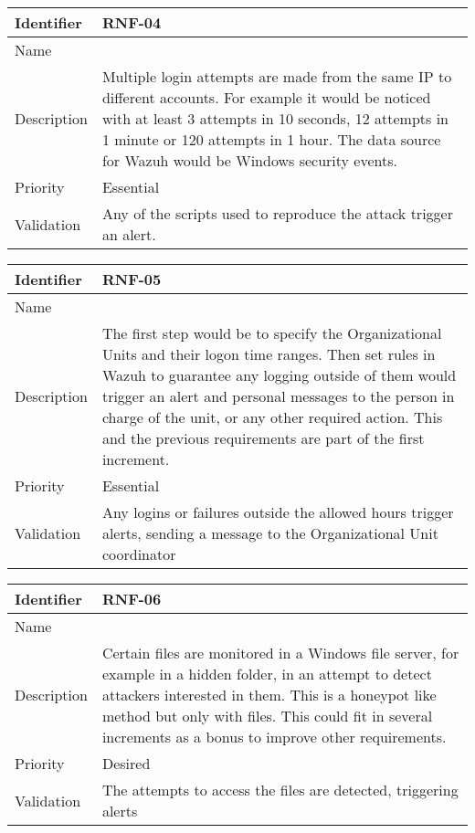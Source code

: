 \begin{table}[H]
	\begin{tabularx}{\textwidth}{|l|X|}
		\hline
		\rowcolor{gray!30}
		Identifier & \textbf{RNF-04} \\ \hline
		Name & \RNFcuatro \\ \hline
		Description & Multiple login attempts are made from the same IP to different accounts. For example it would be noticed with at least 3 attempts in 10 seconds, 12 attempts in 1 minute or 120 attempts in 1 hour. The data source for Wazuh would be Windows security events. \\ \hline
		Priority & Essential \\ \hline
		Validation & Any of the scripts used to reproduce the attack trigger an alert. \\ \hline
	\end{tabularx}
\end{table}
\begin{table}[H]
	\begin{tabularx}{\textwidth}{|l|X|}
		\hline
		\rowcolor{gray!30}
		Identifier & \textbf{RNF-05} \\ \hline
		Name & \RNFcinco \\ \hline
		Description & The first step would be to specify the Organizational Units and their logon time ranges. Then set rules in Wazuh to guarantee any logging outside of them would trigger an alert and personal messages to the person in charge of the unit, or any other required action. \linej This and the previous requirements are part of the first increment.  \\ \hline
		Priority & Essential \\ \hline
		Validation & Any logins or failures outside the allowed hours trigger alerts, sending a message to the Organizational Unit coordinator  \\ \hline
	\end{tabularx}
\end{table}
\begin{table}[H]
	\begin{tabularx}{\textwidth}{|l|X|}
		\hline
		\rowcolor{gray!30}
		Identifier & \textbf{RNF-06} \\ \hline
		Name & \RNFseis \\ \hline
		Description & Certain files are monitored in a Windows file server, for example in a hidden folder, in an attempt to detect attackers interested in them. This is a honeypot like method but only with files. This could fit in several increments as a bonus to improve other requirements.  \\ \hline
		Priority & Desired \\ \hline
		Validation & The attempts to access the files are detected, triggering alerts \\ \hline
	\end{tabularx}
\end{table}
